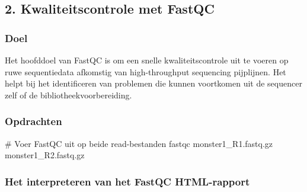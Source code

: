 \documentclass[
  letterpaper,
  DIV=11,
  numbers=noendperiod]{scrartcl}
\newenvironment{Shaded}{\begin{snugshade}}{\end{snugshade}}
\newcommand{\CommentTok}[1]{\textcolor[rgb]{0.37,0.37,0.37}{#1}}
\newcommand{\ExtensionTok}[1]{\textcolor[rgb]{0.00,0.23,0.31}{#1}}
\newcommand{\NormalTok}[1]{\textcolor[rgb]{0.00,0.23,0.31}{#1}}
\begin{document}
\subsection{2. Kwaliteitscontrole met
FastQC}\label{kwaliteitscontrole-met-fastqc}

\subsubsection{Doel}\label{doel}

Het hoofddoel van FastQC is om een snelle kwaliteitscontrole uit te
voeren op ruwe sequentiedata afkomstig van high-throughput sequencing
pijplijnen. Het helpt bij het identificeren van problemen die kunnen
voortkomen uit de sequencer zelf of de bibliotheekvoorbereiding.

\subsubsection{Opdrachten}\label{opdrachten}

\begin{Shaded}
\begin{Highlighting}[]
\CommentTok{\# Voer FastQC uit op beide read{-}bestanden}
\ExtensionTok{fastqc}\NormalTok{ monster1\_R1.fastq.gz monster1\_R2.fastq.gz}
\end{Highlighting}
\end{Shaded}

\subsubsection{Het interpreteren van het FastQC
HTML-rapport}\label{het-interpreteren-van-het-fastqc-html-rapport}
\end{document}
